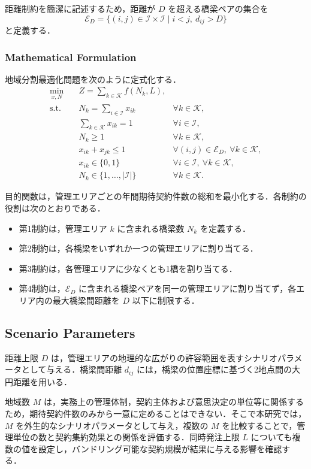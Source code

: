 \documentclass[Journal,letterpaper,InsideFigs,NoLineNumbers]{ascelike-new}
\begin{document}
距離制約を簡潔に記述するため，距離が \(D\) を超える橋梁ペアの集合を
\[
\mathcal{E}_D
=
\{(i,j)\in\mathcal{I}\times\mathcal{I}\mid i<j,\ d_{ij}>D\}
\]
と定義する．

\subsubsection{Mathematical Formulation}

地域分割最適化問題を次のように定式化する．
\[
\begin{array}{lll}
\min_{x,N}\quad
& Z=\displaystyle\sum_{k\in\mathcal{K}}f(N_k,L), & \\
\mathrm{s.t.}\quad
& N_k=\sum_{i\in\mathcal{I}}x_{ik}
& \forall k\in\mathcal{K}, \\
& \sum_{k\in\mathcal{K}}x_{ik}=1
& \forall i\in\mathcal{I}, \\
& N_k\geq 1
& \forall k\in\mathcal{K}, \\
& x_{ik}+x_{jk}\leq 1
& \forall (i,j)\in\mathcal{E}_D,\ \forall k\in\mathcal{K}, \\
& x_{ik}\in\{0,1\}
& \forall i\in\mathcal{I},\ \forall k\in\mathcal{K}, \\
& N_k\in\{1,\ldots,|\mathcal{I}|\}
& \forall k\in\mathcal{K}.
\end{array}
\]

目的関数は，管理エリアごとの年間期待契約件数の総和を最小化する．各制約の役割は次のとおりである．
\begin{itemize}
\item 第1制約は，管理エリア \(k\) に含まれる橋梁数 \(N_k\) を定義する．
\item 第2制約は，各橋梁をいずれか一つの管理エリアに割り当てる．
\item 第3制約は，各管理エリアに少なくとも1橋を割り当てる．
\item 第4制約は，\(\mathcal{E}_D\) に含まれる橋梁ペアを同一の管理エリアに割り当てず，各エリア内の最大橋梁間距離を \(D\) 以下に制限する．
\end{itemize}

\subsection{Scenario Parameters}

距離上限 \(D\) は，管理エリアの地理的な広がりの許容範囲を表すシナリオパラメータとして与える．橋梁間距離 \(d_{ij}\) には，橋梁の位置座標に基づく2地点間の大円距離を用いる．

地域数 \(M\) は，実務上の管理体制，契約主体および意思決定の単位等に関係するため，期待契約件数のみから一意に定めることはできない．そこで本研究では，\(M\) を外生的なシナリオパラメータとして与え，複数の \(M\) を比較することで，管理単位の数と契約集約効果との関係を評価する．同時発注上限 \(L\) についても複数の値を設定し，バンドリング可能な契約規模が結果に与える影響を確認する．
\end{document}
